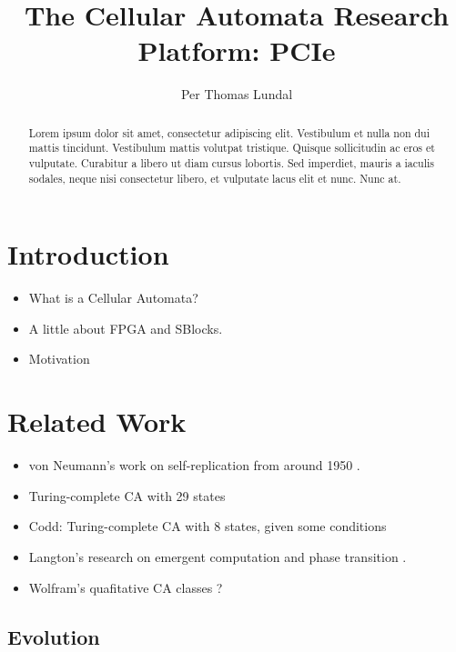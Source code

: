 \documentclass[a4paper]{IEEEtran}
\title{The Cellular Automata Research Platform: PCIe}
\author{Per Thomas Lundal}
\begin{document}
\maketitle

\begin{abstract}

Lorem ipsum dolor sit amet, consectetur adipiscing elit. Vestibulum et nulla non dui mattis tincidunt. Vestibulum mattis volutpat tristique. Quisque sollicitudin ac eros et vulputate. Curabitur a libero ut diam cursus lobortis. Sed imperdiet, mauris a iaculis sodales, neque nisi consectetur libero, et vulputate lacus elit et nunc. Nunc at.

\end{abstract}

\section{Introduction}

\begin{itemize}
    \item What is a Cellular Automata?
    \item A little about FPGA and SBlocks.
    \item Motivation
\end{itemize}

\section{Related Work}

\begin{itemize}
    \item von Neumann's work on self-replication from around 1950 \cite{neumann1966selfreplication}.
    \item Turing-complete CA with 29 states
    \item Codd: Turing-complete CA with 8 states, given some conditions \cite{codd1968cellular}
    \item Langton's research on emergent computation and phase transition \cite{langton1990edgeofchaos}.
    \item Wolfram's quafitative CA classes \cite{wolfram1984complexity}?
\end{itemize}

\subsection{Evolution}
\end{document}
